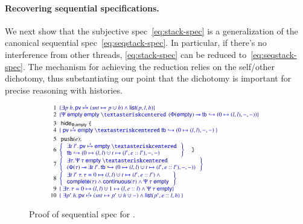 \paragraph{Recovering sequential specifications.}\label{sec:rest-seq}
%
We next show that the subjective spec~\eqref{eq:stack-spec} is a
generalization of the canonical sequential
spec~\eqref{eq:seqstack-spec}. In particular, if there's no
interference from other threads, \eqref{eq:stack-spec} can be reduced
to~\eqref{eq:seqstack-spec}. The mechanism for achieving the reduction
relies on the self/other dichotomy, thus substantiating our point that
the dichotomy is important for precise reasoning with histories.

\begin{wrapfigure}{r}{6.0cm}
\centering
\[
{\scriptsize
\hspace{-5pt}
\begin{array}{r@{\ \ }l}
  \Num{1}& \sspec{\exists p~h\ldot \hpriv \spts (\sent \hpts p \hunion h) \aand \llist(p, l, h)} 
  \\
  \Num{2} & \sspec{\Psi\ \hempty\ \hempty~\sep~\left(\Phi(\hempty)
      \wand \histso{\htb}{0 \hpts (l, l), -, -} \right) }

  \\[2.5pt]
  \Num{3} &  ~\mathsf{hide}_{\Phi, \hempty}~\esc{\{} ~  
  \\
  \Num{4} & 
  \sspec{~\hpriv \spts \hempty ~\sep~ 
    \histso{\htb}{0 \hpts (l, l), -, -}  ~} 
  \\[2.5pt]
  \Num{5} &  ~\esc{push}(e); ~  
  \\
  \Num{6} &
  \spec{\begin{array}{l}
      \exists t~l'\ldot \hpriv \spts \hempty ~\sep\\
    \histso{\htb}{0 \hpts (l, l) \hunion t \hpts (l', e::l'), -, -}
   \end{array}} ~~~~~\esc{\}} 
  \\[2.5pt]
  \Num{7} &
  \spec{\begin{array}{l}
  \exists \hist\ldot \Psi~\hist~\hempty~\sep \\
   (\Phi(\hist) \wand \exists t~l'\ldot \histso{\htb}{0 \hpts  (l, l)
     \hunion t \hpts  (l', e::l'), -, -})
 \end{array}} 
  \\[3.5pt]
  \Num{8} &
  \spec{\begin{array}{l}
          \exists t~l'~\hist\ldot\hist = 0 \hpts (l, l) \hunion t \hpts (l', e::l') \aand \hbox{}\\
          \mathsf{complete}(\hist) \aand \mathsf{continuous}(\hist) \aand \Psi~\hist~\hempty
         \end{array}}
       \\[2.5pt]
  \Num{9} &
  \sspec{~\exists \hist\ldot \hist = 0 \hpts (l, l) \hunion 1 \hpts (l, e::l) \aand \Psi~\hist~\hempty}\\
  \Num{10}& \sspec{~\exists p'~h\ldot \hpriv \spts (\sent \hpts p' \hunion h \hunion -) \aand \llist(p', e::l, h)~}
\end{array}
}
\]
\caption{Proof of sequential spec for .}
\label{fig:seq-proof}
\end{wrapfigure}
